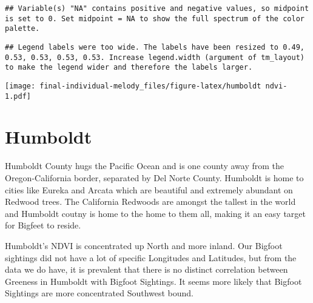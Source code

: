 \documentclass[
]{article}
\begin{document}
\begin{verbatim}
## Variable(s) "NA" contains positive and negative values, so midpoint is set to 0. Set midpoint = NA to show the full spectrum of the color palette.
\end{verbatim}

\begin{verbatim}
## Legend labels were too wide. The labels have been resized to 0.49, 0.53, 0.53, 0.53, 0.53. Increase legend.width (argument of tm_layout) to make the legend wider and therefore the labels larger.
\end{verbatim}

\texttt{[image: final-individual-melody\_files/figure-latex/humboldt ndvi-1.pdf]}

\hypertarget{humboldt}{%
\section{Humboldt}\label{humboldt}}

Humboldt County hugs the Pacific Ocean and is one county away from the
Oregon-California border, separated by Del Norte County. Humboldt is
home to cities like Eureka and Arcata which are beautiful and extremely
abundant on Redwood trees. The California Redwoods are amongst the
tallest in the world and Humboldt coutny is home to the home to them
all, making it an easy target for Bigfeet to reside.

Humboldt's NDVI is concentrated up North and more inland. Our Bigfoot
sightings did not have a lot of specific Longitudes and Latitudes, but
from the data we do have, it is prevalent that there is no distinct
correlation between Greeness in Humboldt with Bigfoot Sightings. It
seems more likely that Bigfoot Sightings are more concentrated Southwest
bound.
\end{document}
